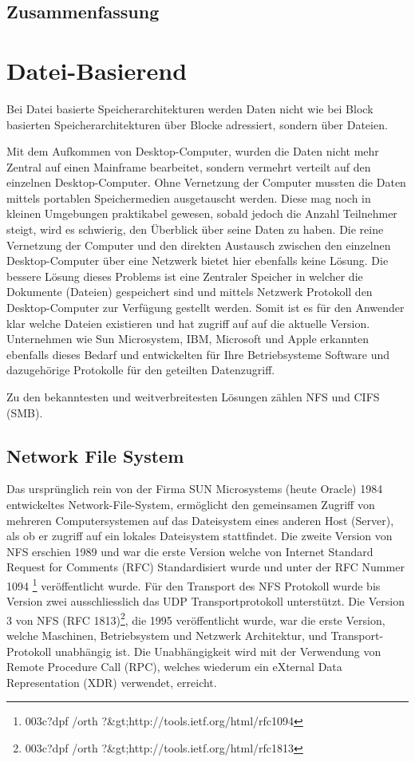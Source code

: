 \subsection{Zusammenfassung}


\section{Datei-Basierend}
Bei Datei basierte Speicherarchitekturen werden Daten nicht wie bei Block basierten Speicherarchitekturen über Blocke adressiert, sondern über Dateien.

Mit dem Aufkommen von Desktop-Computer, wurden die Daten nicht mehr Zentral auf einen Mainframe bearbeitet, sondern vermehrt verteilt auf den einzelnen Desktop-Computer. Ohne Vernetzung der Computer mussten die Daten mittels portablen Speichermedien ausgetauscht werden. Diese mag noch in kleinen Umgebungen praktikabel gewesen, sobald jedoch die Anzahl Teilnehmer steigt, wird es schwierig, den Überblick über seine Daten zu haben. Die reine Vernetzung der Computer und den direkten Austausch zwischen den einzelnen Desktop-Computer über eine Netzwerk bietet hier ebenfalls keine Lösung. Die bessere Lösung dieses Problems ist eine Zentraler Speicher in welcher die Dokumente (Dateien) gespeichert sind und mittels Netzwerk Protokoll den Desktop-Computer zur Verfügung gestellt werden. Somit ist es für den Anwender klar welche Dateien existieren und hat zugriff auf auf die aktuelle Version. Unternehmen wie Sun Microsystem, IBM, Microsoft und Apple erkannten ebenfalls dieses Bedarf und entwickelten für Ihre Betriebsysteme Software und dazugehörige Protokolle für den geteilten Datenzugriff.

Zu den bekanntesten und weitverbreitesten Lösungen zählen NFS und CIFS (SMB).


\subsection{Network File System}
Das ursprünglich rein von der Firma SUN Microsystems (heute Oracle) 1984 entwickeltes Network-File-System, ermöglicht den gemeinsamen Zugriff von mehreren Computersystemen auf das Dateisystem eines anderen Host (Server), als ob er zugriff auf ein lokales Dateisystem stattfindet. Die zweite Version von NFS erschien 1989 und war die erste Version welche von Internet Standard Request for Comments (\gls{RFC}) Standardisiert wurde und unter der RFC Nummer 1094 \footnote{003c?dpf /orth ?&gt;{http://tools.ietf.org/html/rfc1094}} veröffentlicht wurde. Für den Transport des NFS Protokoll wurde bis Version zwei ausschliesslich das \gls{UDP} Transportprotokoll unterstützt.
Die Version 3 von NFS (RFC 1813)\footnote{003c?dpf /orth ?&gt;{http://tools.ietf.org/html/rfc1813}}, die 1995 veröffentlicht wurde, war die erste Version, welche Maschinen, Betriebsystem und Netzwerk Architektur, und Transport-Protokoll unabhängig ist. Die Unabhängigkeit wird mit der Verwendung von Remote Procedure Call (\gls{RPC}), welches wiederum ein eXternal Data Representation (\gls{XDR}) verwendet, erreicht. \cite{Stern2001}

